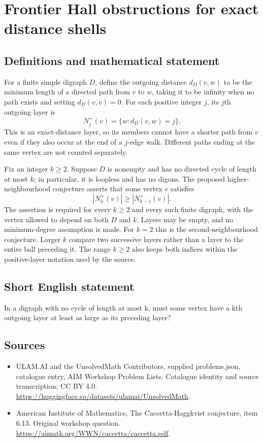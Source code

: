 \documentclass[11pt,a4paper]{article}
\begin{document}
\section*{Frontier Hall obstructions for exact distance shells}\label{statement}

\subsection{Definitions and mathematical statement}
For a finite simple digraph $D$, define the outgoing distance
$d_D(v,w)$ to be the minimum length of a directed path from $v$ to
$w$, taking it to be infinity when no path exists and setting
$d_D(v,v)=0$. For each positive integer $j$, its $j$th outgoing
layer is
\[
                       N_j^+(v)=\{w:d_D(v,w)=j\}.
\]
This is an exact-distance layer, so its members cannot have a shorter
path from $v$ even if they also occur at the end of a $j$-edge walk.
Different paths ending at the same vertex are not counted separately.

Fix an integer $k\ge2$. Suppose $D$ is nonempty and has no directed
cycle of length at most $k$; in particular, it is loopless and has
no digons. The proposed higher-neighbourhood conjecture asserts that
some vertex $v$ satisfies
\[
                          |N_k^+(v)|\ge|N_{k-1}^+(v)|.
\]
The assertion is required for every $k\ge2$ and every such finite
digraph, with the vertex allowed to depend on both $D$ and $k$.
Layers may be empty, and no minimum-degree assumption is made.
For $k=2$ this is the second-neighbourhood conjecture. Larger $k$
compare two successive layers rather than a layer to the entire
ball preceding it. The range $k\ge2$ also keeps both indices within
the positive-layer notation used by the source.
\subsection{Short English statement}
In a digraph with no cycle of length at most k, must some vertex have a kth outgoing layer at least as large as its preceding layer?
\subsection{Sources}
\begin{itemize}
\item[S1] ULAM.AI and the UnsolvedMath Contributors, supplied problems.json, catalogue entry, AIM Workshop Problem Lists. Catalogue identity and source transcription; CC BY 4.0.
\url{https://huggingface.co/datasets/ulamai/UnsolvedMath}.
\item[S2] American Institute of Mathematics, The Caccetta-Haggkvist conjecture, item 6.13. Original workshop question.
\url{https://aimath.org/WWN/caccetta/caccetta.pdf}.
\end{itemize}
\end{document}
